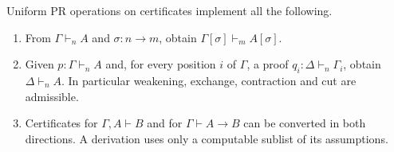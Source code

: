 \begin{theorem}\label{thm:graft}
Uniform PR operations on certificates implement all the following.
\begin{enumerate}
\item From $\Gamma\vdash_n A$ and $\sigma:n\to m$, obtain
$\Gamma[\sigma]\vdash_m A[\sigma]$.
\item Given $p:\Gamma\vdash_n A$ and, for every position $i$ of
$\Gamma$, a proof $q_i:\Delta\vdash_n\Gamma_i$, obtain
$\Delta\vdash_n A$. In particular weakening, exchange, contraction
and cut are admissible.
\item Certificates for $\Gamma,A\vdash B$ and for
$\Gamma\vdash A\to B$ can be converted in both directions.
A derivation uses only a computable sublist of its assumptions.
\end{enumerate}
\end{theorem}
